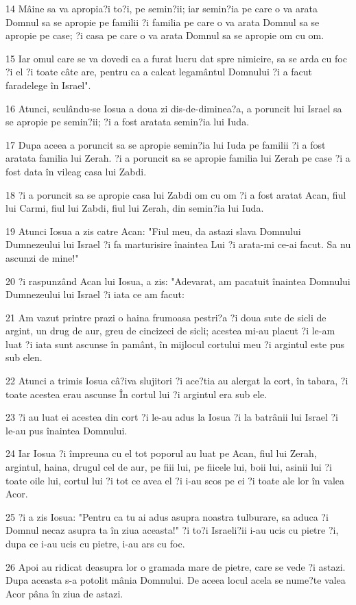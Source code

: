 \par 14 Mâine sa va apropia?i to?i, pe semin?ii; iar semin?ia pe care o va arata Domnul sa se apropie pe familii ?i familia pe care o va arata Domnul sa se apropie pe case; ?i casa pe care o va arata Domnul sa se apropie om cu om.
\par 15 Iar omul care se va dovedi ca a furat lucru dat spre nimicire, sa se arda cu foc ?i el ?i toate câte are, pentru ca a calcat legamântul Domnului ?i a facut faradelege în Israel".
\par 16 Atunci, sculându-se Iosua a doua zi dis-de-diminea?a, a poruncit lui Israel sa se apropie pe semin?ii; ?i a fost aratata semin?ia lui Iuda.
\par 17 Dupa aceea a poruncit sa se apropie semin?ia lui Iuda pe familii ?i a fost aratata familia lui Zerah. ?i a poruncit sa se apropie familia lui Zerah pe case ?i a fost data în vileag casa lui Zabdi.
\par 18 ?i a poruncit sa se apropie casa lui Zabdi om cu om ?i a fost aratat Acan, fiul lui Carmi, fiul lui Zabdi, fiul lui Zerah, din semin?ia lui Iuda.
\par 19 Atunci Iosua a zis catre Acan: "Fiul meu, da astazi slava Domnului Dumnezeului lui Israel ?i fa marturisire înaintea Lui ?i arata-mi ce-ai facut. Sa nu ascunzi de mine!"
\par 20 ?i raspunzând Acan lui Iosua, a zis: "Adevarat, am pacatuit înaintea Domnului Dumnezeului lui Israel ?i iata ce am facut:
\par 21 Am vazut printre prazi o haina frumoasa pestri?a ?i doua sute de sicli de argint, un drug de aur, greu de cincizeci de sicli; acestea mi-au placut ?i le-am luat ?i iata sunt ascunse în pamânt, în mijlocul cortului meu ?i argintul este pus sub elen.
\par 22 Atunci a trimis Iosua câ?iva slujitori ?i ace?tia au alergat la cort, în tabara, ?i toate acestea erau ascunse În cortul lui ?i argintul era sub ele.
\par 23 ?i au luat ei acestea din cort ?i le-au adus la Iosua ?i la batrânii lui Israel ?i le-au pus înaintea Domnului.
\par 24 Iar Iosua ?i împreuna cu el tot poporul au luat pe Acan, fiul lui Zerah, argintul, haina, drugul cel de aur, pe fiii lui, pe fiicele lui, boii lui, asinii lui ?i toate oile lui, cortul lui ?i tot ce avea el ?i i-au scos pe ei ?i toate ale lor în valea Acor.
\par 25 ?i a zis Iosua: "Pentru ca tu ai adus asupra noastra tulburare, sa aduca ?i Domnul necaz asupra ta în ziua aceasta!" ?i to?i Israeli?ii i-au ucis cu pietre ?i, dupa ce i-au ucis cu pietre, i-au ars cu foc.
\par 26 Apoi au ridicat deasupra lor o gramada mare de pietre, care se vede ?i astazi. Dupa aceasta s-a potolit mânia Domnului. De aceea locul acela se nume?te valea Acor pâna în ziua de astazi.

